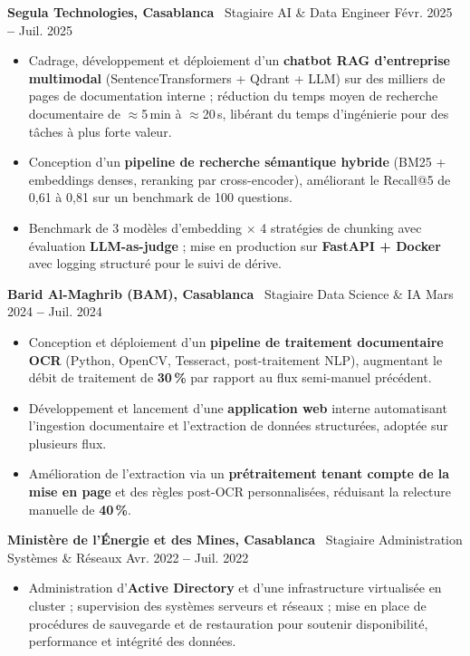 \documentclass[10pt,a4paper]{article}
\newcommand{\role}[3]{%
  \vspace{1pt}\noindent\textbf{#1} \textbar\ #2 \hfill \textcolor{mutedgray}{\small #3}\par\vspace{-2pt}
}
\begin{document}
\role{Segula Technologies, Casablanca}{Stagiaire AI \& Data Engineer}{Févr. 2025 \textbf{--} Juil. 2025}
\begin{itemize}
    \item Cadrage, développement et déploiement d'un \textbf{chatbot RAG d'entreprise multimodal} (SentenceTransformers + Qdrant + LLM) sur des milliers de pages de documentation interne ; réduction du temps moyen de recherche documentaire de $\approx$5\,min à $\approx$20\,s, libérant du temps d'ingénierie pour des tâches à plus forte valeur.
    \item Conception d'un \textbf{pipeline de recherche sémantique hybride} (BM25 + embeddings denses, reranking par cross-encoder), améliorant le Recall@5 de 0,61 à 0,81 sur un benchmark de 100 questions.
    \item Benchmark de 3 modèles d'embedding $\times$ 4 stratégies de chunking avec évaluation \textbf{LLM-as-judge} ; mise en production sur \textbf{FastAPI + Docker} avec logging structuré pour le suivi de dérive.
\end{itemize}\vspace{-6pt}

\role{Barid Al-Maghrib (BAM), Casablanca}{Stagiaire Data Science \& IA}{Mars 2024 \textbf{--} Juil. 2024}
\begin{itemize}
    \item Conception et déploiement d'un \textbf{pipeline de traitement documentaire OCR} (Python, OpenCV, Tesseract, post-traitement NLP), augmentant le débit de traitement de \textbf{30\,\%} par rapport au flux semi-manuel précédent.
    \item Développement et lancement d'une \textbf{application web} interne automatisant l'ingestion documentaire et l'extraction de données structurées, adoptée sur plusieurs flux.
    \item Amélioration de l'extraction via un \textbf{prétraitement tenant compte de la mise en page} et des règles post-OCR personnalisées, réduisant la relecture manuelle de \textbf{40\,\%}.
\end{itemize}\vspace{-6pt}

\role{Ministère de l'Énergie et des Mines, Casablanca}{Stagiaire Administration Systèmes \& Réseaux}{Avr. 2022 \textbf{--} Juil. 2022}
\begin{itemize}
    \item Administration d'\textbf{Active Directory} et d'une infrastructure virtualisée en cluster ; supervision des systèmes serveurs et réseaux ; mise en place de procédures de sauvegarde et de restauration pour soutenir disponibilité, performance et intégrité des données.
\end{itemize}
\end{document}
